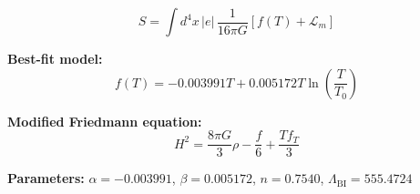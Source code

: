 
\begin{equation}
  S = \int d^4x \, |e| \, \frac{1}{16\pi G} \left[ f(T) + \mathcal{L}_m \right]
\end{equation}

\textbf{Best-fit model:}
\begin{equation}
  f(T) = -0.003991 T + 0.005172 T \ln\!\left(\frac{T}{T_0}\right)
\end{equation}

\textbf{Modified Friedmann equation:}
\begin{equation}
  H^2 = \frac{8\pi G}{3} \rho - \frac{f}{6} + \frac{T f_T}{3}
\end{equation}

\textbf{Parameters:}
$\alpha = -0.003991$, \quad
$\beta = 0.005172$, \quad
$n = 0.7540$, \quad
$\Lambda_{\text{BI}} = 555.4724$